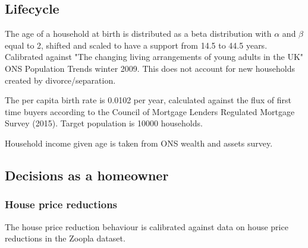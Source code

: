 \documentclass{article}
\begin{document}
\subsection{Lifecycle}
The age of a household at birth is distributed as a beta distribution with $\alpha$ and $\beta$ equal to 2, shifted and scaled to have a support from 14.5 to 44.5 years. Calibrated against "The changing living arrangements of young adults in the UK" ONS Population Trends winter 2009. This does not account for new households created by divorce/separation.

The per capita birth rate is 0.0102 per year, calculated against the flux of first time buyers according to the Council of Mortgage Lenders Regulated Mortgage Survey (2015). Target population is 10000 households.

Household income given age is taken from ONS wealth and assets survey. 

\subsection{Decisions as a homeowner}
\subsubsection{House price reductions}
The house price reduction behaviour is calibrated against data on house price reductions in the Zoopla dataset.
\end{document}
